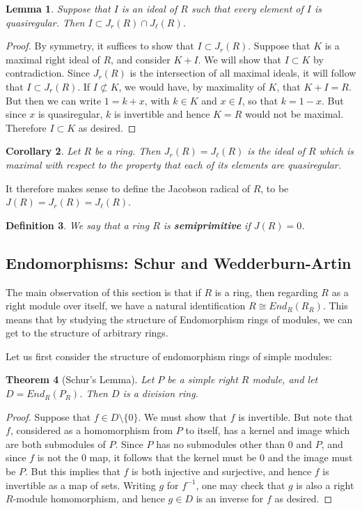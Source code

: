 \documentclass[12pt]{report}
\theoremstyle{plain}
\newtheorem{thm}{Theorem}[section]
\newtheorem{defn}[thm]{Definition}
\newtheorem{lem}[thm]{Lemma}
\newtheorem{cor}[thm]{Corollary}
\newcommand{\X}[1]{#1\index{#1}}
\newcommand{\Xb}[1]{\textbf{#1}\index{#1}}
\begin{document}
\begin{lem}
Suppose that $I$ is an ideal of $R$ such that every element of $I$ is
quasiregular. Then $I \subset J_r(R) \cap J_\ell(R)$.
\end{lem}
\begin{proof}
By symmetry, it suffices to show that $I \subset J_r(R)$.
Suppose that $K$ is a maximal right ideal of $R$, and consider $K + I$. We
will show that $I \subset K$ by contradiction. Since $J_r(R)$ is the
intersection of all maximal ideals, it will follow that $I \subset J_r(R)$.
If $I \not\subset K$, we would have, by maximality of $K$, that 
$K + I = R$. But then we can write $1 = k + x$, with $k \in K$ and $x \in I$, so
that $k = 1 - x$. But since $x$ is quasiregular, $k$ is invertible and
hence $K = R$ would not be maximal. Therefore $I \subset K$ as desired.
\end{proof}

\begin{cor}
Let $R$ be a ring. Then $J_r(R) = J_\ell(R)$ is the ideal of $R$ which is
maximal with respect to the property that each of its elements are
quasiregular.
\end{cor}

It therefore makes sense to define the \X{Jacobson radical} of $R$, to be $J(R)
= J_r(R) = J_\ell(R)$.

\begin{defn}
We say that a ring $R$ is \Xb{semiprimitive} if $J(R) = 0$.
\end{defn}

\subsection{Endomorphisms: Schur and Wedderburn-Artin}

The main observation of this section is that if $R$ is a ring, then
regarding $R$ as a right module over itself, we have a natural
identification $R \cong End_R(R_R)$. This means that by studying the
structure of Endomorphism rings of modules, we can get to the structure of
arbitrary rings.

Let us first consider the structure of endomorphism rings of simple
modules:
\begin{thm}[Schur's Lemma] 
Let $P$ be a simple right $R$ module, and let $D = End_R(P_R)$. Then $D$ is
a division ring.
\end{thm}
\begin{proof}
Suppose that $f \in D \setminus \{0\}$. We must show that $f$ is invertible.
But note that $f$, considered as a homomorphism from $P$ to itself, has a
kernel and image which are both submodules of $P$. Since $P$ has no
submodules other than $0$ and $P$, and since $f$ is not the $0$ map, it
follows that the kernel must be $0$ and the image must be $P$. But this
implies that $f$ is both injective and surjective, and hence $f$ is
invertible as a map of sets. Writing $g$ for $f^{-1}$, one may check that
$g$ is also a right $R$-module homomorphism, and hence $g \in D$ is an
inverse for $f$ as desired.
\end{proof}
\end{document}
